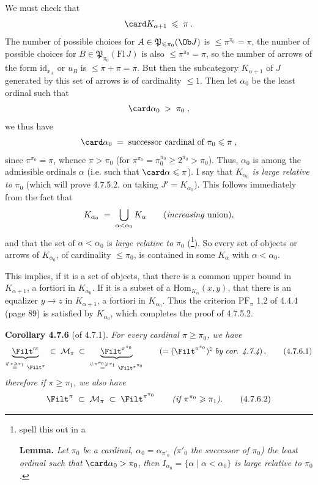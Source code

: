 We must check that
\[
\card K_{\alpha+1} \;\leqslant\; \pi \;.
\]
The number of possible choices for $A \in \mathfrak{P}_{\leqslant \pi_0}(\Ob J)$  is $\leqslant \pi^{\pi_0} = \pi$, the number of possible choices for $B \in \mathfrak{P}_{\pi_0}(\mathrm{Fl}\, J)$ is also $\leqslant \pi^{\pi_0} = \pi$, so the number of arrows of the form $\mathrm{id}_{x_A}$ or $u_B$ is $\leqslant \pi + \pi = \pi$. But then the subcategory $K_{\alpha+1}$ of $J$ generated by this set of arrows is of cardinality $\leqslant 1$. Then let %
{}
$\alpha_0$ be the least ordinal such that
\[
\card \alpha_0 \;>\; \pi_0 \;,
\]
we thus have
\[
\card \alpha_0 \;=\; \text{successor cardinal of } \pi_0 \leqslant \pi \;,
\]
since $\pi^{\pi_0} = \pi$, whence $\pi > \pi_0$ (for $\pi^{\pi_0} = \pi_0^{\pi_0} \geqslant 2^{\pi_0} > \pi_0$). Thus, $\alpha_0$ is among the admissible ordinals $\alpha$ (i.e. such that $\card \alpha \leqslant \pi$). I say that $K_{\alpha_0}$ \textit{is large relative to} $\pi_0$ (which will prove 4.7.5.2, on taking $J' = K_{\alpha_0}$). This follows immediately from the fact that
\[
K_{\alpha_0} \;=\; \bigcup_{\alpha < \alpha_0} K_{\alpha} \qquad (\text{\textit{increasing} union}),
\]
and that the set of $\alpha < \alpha_0$ is \textit{large relative to} $\pi_0$ (\footnote[71]{spell this out in a

\textbf{Lemma.} \textit{Let $\pi_0$ be a cardinal, $\alpha_0 = \alpha_{\pi'_0}$ ($\pi'_0$ the successor of $\pi_0$) the least ordinal such that} $\card \alpha_0 > \pi_0$, \textit{then $I_{\alpha_0} = \{\alpha \mid \alpha < \alpha_0\}$ is large relative to $\pi_0$.}}). So every set of objects or arrows of $K_{\alpha_0}$, of cardinality $\leqslant \pi_0$, is contained in some $K_{\alpha}$ with $\alpha < \alpha_0$.

This implies, if it is a set of objects, that there is a common upper bound in $K_{\alpha+1}$, a fortiori in $K_{\alpha_0}$. If it is a subset of a $\mathrm{Hom}_{K_{\alpha}}(x,y)$, that there is an equalizer $y \longrightarrow z$ in $K_{\alpha+1}$, a fortiori in $K_{\alpha_0}$. Thus the criterion $\mathrm{PF}_{\pi}$ 1,2 of 4.4.4 (page 89) is satisfied by $K_{\alpha_0}$, which completes the proof of 4.7.5.2.

\textbf{Corollary 4.7.6} (of 4.7.1). \textit{For every cardinal $\pi \geqslant \pi_0$, we have}
\[
\underbrace{\Filt'^{\pi}}_{\overset{\textit{if } \pi \geqslant \pi_1}{=}\ \Filt^{\pi}} \;\subset\; \mathcal{M}_{\pi} \;\subset\; \underbrace{\Filt^{\pi^{\pi_0}}}_{\overset{\textit{if } \pi^{\pi_0} \geqslant \pi_1}{=}\ \Filt^{\pi^{\pi_0}}} \qquad (= (\Filt^{\pi^{\pi_0}})^{\natural} \textit{ by cor. 4.7.4})\,, \tag*{(4.7.6.1)} %
\]
\textit{therefore if $\pi \geqslant \pi_1$, we also have}
\[
\Filt^{\pi} \;\subset\; \mathcal{M}_{\pi} \;\subset\; \Filt^{\pi^{\pi_0}} \qquad \textit{(if $\pi^{\pi_0} \geqslant \pi_1$).} \tag*{(4.7.6.2)}
\]

